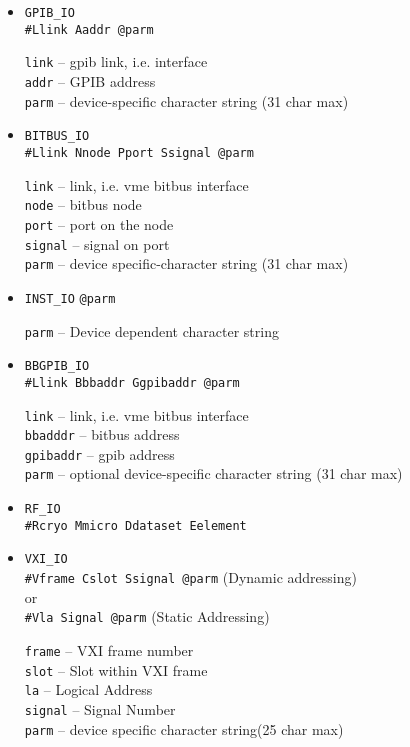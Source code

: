 \begin{description}
\begin{itemize}
\begin{itemize}
\item \verb|GPIB_IO| \\
\verb|#Llink Aaddr @parm|

\verb|link| -- gpib link, i.e. interface \\
\verb|addr| -- GPIB address \\
\verb|parm| -- device-specific character string (31 char max)

\item \verb|BITBUS_IO| \\
\verb|#Llink Nnode Pport Ssignal @parm|

\verb|link| -- link, i.e.  vme bitbus interface \\
\verb|node| -- bitbus node \\
\verb|port| -- port on the node \\
\verb|signal| -- signal on port \\
\verb|parm| -- device specific-character string (31 char max)

\item \verb|INST_IO|
\verb|@parm|

\verb|parm| -- Device dependent character string

\item \verb|BBGPIB_IO| \\
\verb|#Llink Bbbaddr Ggpibaddr @parm|

\verb|link| -- link, i.e. vme bitbus interface \\
\verb|bbadddr| -- bitbus address \\
\verb|gpibaddr| -- gpib address \\
\verb|parm| -- optional device-specific character string (31 char max)

\item \verb|RF_IO| \\
\verb|#Rcryo Mmicro Ddataset Eelement|

\item \verb|VXI_IO| \\
\verb|#Vframe Cslot Ssignal @parm| (Dynamic addressing) \\
     or \\
\verb|#Vla Signal @parm|  (Static Addressing)

\verb|frame| -- VXI frame number \\
\verb|slot| -- Slot within VXI frame \\
\verb|la| -- Logical Address \\
\verb|signal| -- Signal Number \\
\verb|parm| -- device specific character string(25 char max)
\end{itemize}
\end{itemize}


\end{description}
